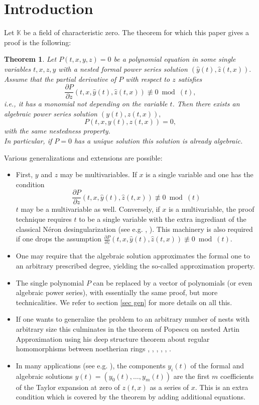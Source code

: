 \documentclass[10pt, a4paper]{article}
\newtheorem{theorem}{Theorem}[section]
\def\wh{\widehat}
\theoremstyle{remark}
\theoremstyle{remark}
\begin{document}
\section{Introduction}
Let $\mathbb{K}$ be a field of characteristic zero. The theorem for which this paper gives a proof is the following:
\begin{theorem}\label{thm1}
    Let $P(t,x,y,z)=0$ be a polynomial equation in some single variables $t,x,z,y$ with a nested formal power series solution $(\wh{y}(t),\wh{z}(t,x)).$ Assume that the partial derivative of $P$ with respect to $z$ satisfies $$\frac{\partial P}{\partial z}(t,x,\wh{y}(t),\wh{z}(t,x)) \not\equiv 0 \bmod (t),$$ i.e., it has a monomial not depending on the variable $t$. Then there exists an algebraic power series solution $(y(t),z(t,x)),$ $$P(t,x,y(t),z(t,x))=0,$$ with the same nestedness property.
    \\In particular, if $P=0$ has a unique solution this solution is already algebraic.
\end{theorem}
       Various generalizations and extensions are possible: 
        \begin{itemize}
        \item First, $y$ and $z$ may be multivariables. If $x$ is a single variable and one has the condition $$\frac{\partial P}{\partial z}(t,x,\wh{y}(t),\wh{z}(t,x)) \not\equiv 0 \bmod (t)$$ $t$ may be a multivariable as well. Conversely, if $x$ is a multivariable, the proof technique requires $t$ to be a single variable with the extra ingrediant of the classical N\'{e}ron desingularization (see e.g. \cite{strongartin1}, \cite{Denef1980}). This machinery is also required if one drops the assumption $\frac{\partial P}{\partial z}(t,x,\wh{y}(t),\wh{z}(t,x)) \not\equiv 0 \bmod (t)$.
        \item One may require that the algebraic solution approximates the formal one to an arbitrary prescribed degree, yielding the so-called approximation property.\\
        \item The single polynomial $P$ can be replaced by a vector of polynomials (or even algebraic power series), with essentially the same proof, but more technicalities. We refer to section \ref{sec gen} for more details on all this. \\
         \item If one wants to generalize the problem to an arbitrary number of nests with arbitrary size this culminates in the theorem of Popescu on nested Artin Approximation using his deep structure theorem about regular homomorphisms between noetherian rings \cite{popescu_1986}, \cite{Spivakovsky}, \cite{swan}, \cite{OGOMA199457}, \cite{stacks-projectpop}, \cite{SB_1993-1994__36__259_0}.
        \item In many applications (see e.g. \cite{bousquetmélou2005polynomialequationscatalyticvariable}), the components $y_i(t)$ of the formal and algebraic solutions $y(t)=(y_0(t),\ldots,y_m(t))$ are the first $m$ coefficients of the Taylor expansion at zero of $z(t,x)$ as a series of $x$. This is an extra condition which is covered by the theorem by adding additional equations.\\
        \end{itemize}
\end{document}
